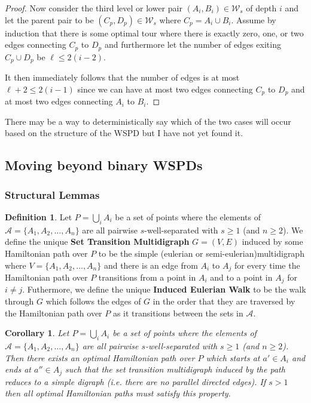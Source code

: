 \documentclass{article}
\newcommand{\PairDecomp}{\mathcal{W}}
\newtheorem{corollary}{Corollary}[thm]
\theoremstyle{definition}
\newtheorem{defn}[thm]{Definition}
\newcommand{\ACollection}{\mathcal{A}}
\begin{document}
\begin{proof}
    Now consider the third level or lower pair $(A_i, B_i) \in \PairDecomp_s$ of depth $i$ and let the parent pair to be $(C_p, D_p) \in \PairDecomp_s$ where $C_p = A_i \cup B_i$. 
    Assume by induction that there is some optimal tour where there is exactly zero, one, or two edges connecting $C_p$ to $D_p$ and furthermore let the number of edges exiting $C_p \cup D_p$ be $\ell \leq 2(i-2)$.

    It then immediately follows that the number of edges is at most $\ell + 2 \leq 2(i-1)$ since we can have at most two edges connecting $C_p$ to $D_p$ and at most two edges connecting $A_i$ to $B_i$.

    
\end{proof}
 

There may be a way to deterministically say which of the two cases will occur based on the structure of the WSPD but I have not yet found it.

\subsection{Moving beyond binary WSPDs}

\subsubsection{Structural Lemmas}

\begin{defn}\label{defn:set_transition_multidigraph}
    Let $P = \bigcup_i A_i$ be a set of points where the elements of $\ACollection = \{A_1, A_2, \ldots, A_n\}$ are all pairwise $s$-well-separated with $s \geq 1$ (and $n \geq 2$).
    We define the unique \textbf{Set Transition Multidigraph} $G = (V,E)$ induced by some Hamiltonian path over $P$ to be the simple (eulerian or semi-eulerian)multidigraph where $V = \{A_1, A_2, \ldots, A_n\}$ and there is an edge from $A_i$ to $A_j$ for every time the Hamiltonian path over $P$ transitions from a point in $A_i$ and to a point in $A_j$ for $i \neq j$.
    Futhermore, we define the unique \textbf{Induced Eulerian Walk} to be the walk through $G$ which follows the edges of $G$ in the order that they are traversed by the Hamiltonian path over $P$ as it transitions between the sets in $\ACollection$.
\end{defn}



\begin{corollary}\label{cor:set_transition_multidigraph_reduction}
    Let $P = \bigcup_i A_i$ be a set of points where the elements of $\ACollection = \{A_1, A_2, \ldots, A_n\}$ are all pairwise $s$-well-separated with $s \geq 1$ (and $n \geq 2$).
    Then there exists an optimal Hamiltonian path over $P$ which starts at $a' \in A_i$ and ends at $a'' \in A_j$ such that the set transition multidigraph  induced by the path reduces to a simple digraph (i.e. there are no parallel directed edges).
    If $s > 1$ then all optimal Hamiltonian paths must satisfy this property.
\end{corollary}
\end{document}
